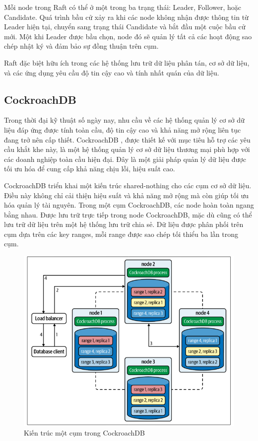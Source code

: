\documentclass{article}[13pt]
\begin{document}
Mỗi node trong Raft có thể ở một trong ba trạng thái: Leader, Follower, hoặc Candidate. Quá trình bầu cử xảy ra khi các node không nhận được thông tin từ Leader hiện tại, chuyển sang trạng thái Candidate và bắt đầu một cuộc bầu cử mới. Một khi Leader được bầu chọn, node đó sẽ quản lý tất cả các hoạt động sao chép nhật ký và đảm bảo sự đồng thuận trên cụm.

Raft đặc biệt hữu ích trong các hệ thống lưu trữ dữ liệu phân tán, cơ sở dữ liệu, và các ứng dụng yêu cầu độ tin cậy cao và tính nhất quán của dữ liệu.



\subsection{CockroachDB}

Trong thời đại kỹ thuật số ngày nay, nhu cầu về các hệ thống quản lý cơ sở dữ liệu đáp ứng được tính toàn cầu, độ tin cậy cao và khả năng mở rộng liên tục đang trở nên cấp thiết. CockroachDB \cite{taft2020cockroachdb}, được thiết kế với mục tiêu hỗ trợ các yêu cầu khắt khe này, là một hệ thống quản lý cơ sở dữ liệu thương mại phù hợp với các doanh nghiệp toàn cầu hiện đại. Đây là một giải pháp quản lý dữ liệu được tối ưu hóa để cung cấp khả năng chịu lỗi, hiệu suất cao.



CockroachDB triển khai một kiến trúc shared-nothing cho các cụm cơ sở dữ liệu. Điều này không chỉ cải thiện hiệu suất và khả năng mở rộng mà còn giúp tối ưu hóa quản lý tài nguyên. Trong một cụm CockroachDB, các node hoàn toàn ngang bằng nhau. Được lưu trữ trực tiếp trong node CockroachDB, mặc dù cũng có thể lưu trữ dữ liệu trên một hệ thống lưu trữ chia sẻ. Dữ liệu được phân phối trên cụm dựa trên các key ranges, mỗi range được sao chép tối thiểu ba lần trong cụm.

\begin{figure}
    \centering
    \includegraphics[width=0.8\linewidth]{CockroachdbArc.png}
    \caption{Kiến trúc một cụm trong CockroachDB \cite{CockroachDBGuide}}
    \label{fig:CockroachdbArc}
\end{figure}
\end{document}
